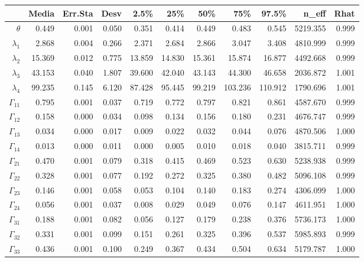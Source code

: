 \documentclass[a4paper]{article}\usepackage[]{graphicx}\usepackage[]{color}
\begin{document}
\begin{table}[ht]
\centering
\begin{tabular}{rrrrrrrrrrr}
  \hline
 & Media & Err.Sta & Desv & 2.5\% & 25\% & 50\% & 75\% & 97.5\% & n\_eff & Rhat \\ 
  \hline
$\theta$ & 0.449 & 0.001 & 0.050 & 0.351 & 0.414 & 0.449 & 0.483 & 0.545 & 5219.355 & 0.999 \\ 
  $\lambda_1$ & 2.868 & 0.004 & 0.266 & 2.371 & 2.684 & 2.866 & 3.047 & 3.408 & 4810.999 & 0.999 \\ 
  $\lambda_2$ & 15.369 & 0.012 & 0.775 & 13.859 & 14.830 & 15.361 & 15.874 & 16.877 & 4492.668 & 0.999 \\ 
  $\lambda_3$ & 43.153 & 0.040 & 1.807 & 39.600 & 42.040 & 43.143 & 44.300 & 46.658 & 2036.872 & 1.001 \\ 
  $\lambda_4$ & 99.235 & 0.145 & 6.120 & 87.428 & 95.445 & 99.219 & 103.236 & 110.912 & 1790.696 & 1.001 \\ 
  $\Gamma_{11}$ & 0.795 & 0.001 & 0.037 & 0.719 & 0.772 & 0.797 & 0.821 & 0.861 & 4587.670 & 0.999 \\ 
  $\Gamma_{12}$ & 0.158 & 0.000 & 0.034 & 0.098 & 0.134 & 0.156 & 0.180 & 0.231 & 4676.747 & 0.999 \\ 
  $\Gamma_{13}$ & 0.034 & 0.000 & 0.017 & 0.009 & 0.022 & 0.032 & 0.044 & 0.076 & 4870.506 & 1.000 \\ 
  $\Gamma_{14}$ & 0.013 & 0.000 & 0.011 & 0.000 & 0.005 & 0.010 & 0.018 & 0.040 & 3815.711 & 0.999 \\ 
  $\Gamma_{21}$ & 0.470 & 0.001 & 0.079 & 0.318 & 0.415 & 0.469 & 0.523 & 0.630 & 5238.938 & 0.999 \\ 
  $\Gamma_{22}$ & 0.328 & 0.001 & 0.077 & 0.192 & 0.272 & 0.325 & 0.380 & 0.482 & 5096.108 & 0.999 \\ 
  $\Gamma_{23}$ & 0.146 & 0.001 & 0.058 & 0.053 & 0.104 & 0.140 & 0.183 & 0.274 & 4306.099 & 1.000 \\ 
  $\Gamma_{24}$ & 0.056 & 0.001 & 0.037 & 0.008 & 0.029 & 0.049 & 0.076 & 0.147 & 4611.951 & 1.000 \\ 
  $\Gamma_{31}$ & 0.188 & 0.001 & 0.082 & 0.056 & 0.127 & 0.179 & 0.238 & 0.376 & 5736.173 & 1.000 \\ 
  $\Gamma_{32}$ & 0.331 & 0.001 & 0.099 & 0.151 & 0.261 & 0.325 & 0.396 & 0.537 & 5985.893 & 0.999 \\ 
  $\Gamma_{33}$ & 0.436 & 0.001 & 0.100 & 0.249 & 0.367 & 0.434 & 0.504 & 0.634 & 5179.787 & 1.000 \\ 

\end{tabular}
\end{table}
\end{document}
